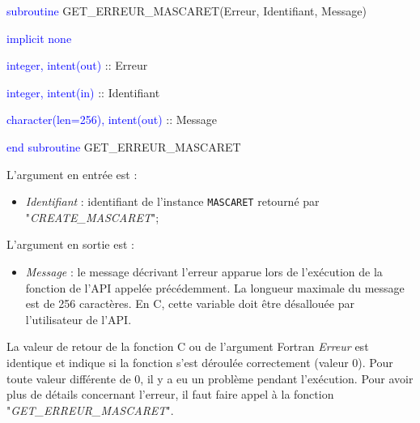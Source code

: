 \documentclass[a4paper,11pt]{article}
\begin{document}
 \vspace{0.5cm}
 
    \textcolor{blue}{subroutine} GET\_ERREUR\_MASCARET(Erreur, Identifiant, Message)
    
        \hspace{1cm}\textcolor{blue}{implicit none}                 
        
        \hspace{1cm} \textcolor{blue}{integer, intent(out)} :: Erreur
        
        \hspace{1cm} \textcolor{blue}{integer, intent(in)}  :: Identifiant
        
        \hspace{1cm} \textcolor{blue}{character(len=256), intent(out)}  :: Message
        
    \textcolor{blue}{end subroutine} GET\_ERREUR\_MASCARET
    
 \vspace{0.5cm}

 L'argument en entr\'ee est :
 
 \vspace{0.5cm}
 
 \begin{itemize}
 
    \item \textit{Identifiant} : identifiant de l'instance \texttt{MASCARET} retourn\'e par "\textit{CREATE\_MASCARET}";
    
 \end{itemize}
 
 \vspace{0.5cm}

 L'argument en sortie est :

  \vspace{0.5cm}

  \begin{itemize}
  
     \item \textit{Message} : le message d\'ecrivant l'erreur apparue lors de l'ex\'ecution de la fonction de l'API appel\'ee pr\'ec\'edemment. La longueur maximale du message est de 256 caract\`eres. En C, cette variable doit \^etre d\'esallou\'ee par l'utilisateur de l'API.
    
  \end{itemize}

 \vspace{0.5cm}
 
 La valeur de retour de la fonction C ou de l'argument Fortran \textit{Erreur} est identique et indique si la fonction s'est d\'eroul\'ee correctement (valeur 0). Pour toute valeur diff\'erente de 0, il y a eu un probl\`eme pendant l'ex\'ecution. Pour avoir plus de d\'etails concernant l'erreur, il faut faire appel \`a la fonction "\textit{GET\_ERREUR\_MASCARET}".
\end{document}
